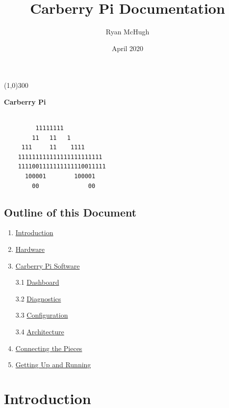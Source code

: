 \documentclass{article}
\title{Carberry Pi Documentation}
\author{Ryan McHugh}
\date{April 2020}
\begin{document}
\maketitle


\begin{center}
\line(1,0){300}
\end{center}


\setcounter{secnumdepth}{2}


\textbf{Carberry Pi}

\begin{verbatim}

         11111111
        11   11   1
     111     11    1111
    111111111111111111111111
    1111001111111111110011111
      100001        100001
        00              00            
\end{verbatim}

\hypertarget{outline-of-this-document}{%
\subsection{Outline of this Document}\label{outline-of-this-document}}

\begin{enumerate}
\def\labelenumi{\arabic{enumi}.}
\item
  \protect\hyperlink{introduction}{Introduction}
\item
  \protect\hyperlink{hardware}{Hardware}
\item
  \protect\hyperlink{software}{Carberry Pi Software}

  3.1 \protect\hyperlink{dashboard}{Dashboard}

  3.2 \protect\hyperlink{diagnostics}{Diagnostics}

  3.3 \protect\hyperlink{configuration}{Configuration}

  3.4 \protect\hyperlink{architecture}{Architecture}
  
\item
  \protect\hyperlink{connecting-the-pieces}{Connecting the Pieces}
\item
  \protect\hyperlink{getting-up-and-running}{Getting Up and Running}
\end{enumerate}

\hypertarget{introduction}{%
\section{Introduction}\label{introduction}}
\end{document}
